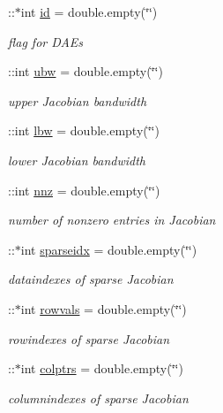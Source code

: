 \begin{DoxyCompactItemize}
\+::$\ast$int \mbox{\hyperlink{classamimodel_acf2488b95c97e0378c9bf49de3b50f28}{id}} = double.\+empty(\char`\"{}\char`\"{})
\begin{DoxyCompactList}\small\item\em flag for D\+A\+Es \end{DoxyCompactList}\item 
\+::int \mbox{\hyperlink{classamimodel_a955c9d10635afed4ebc04c60010e5d40}{ubw}} = double.\+empty(\char`\"{}\char`\"{})
\begin{DoxyCompactList}\small\item\em upper Jacobian bandwidth \end{DoxyCompactList}\item 
\+::int \mbox{\hyperlink{classamimodel_a784f5fb2b8eda576179be087c2a09a39}{lbw}} = double.\+empty(\char`\"{}\char`\"{})
\begin{DoxyCompactList}\small\item\em lower Jacobian bandwidth \end{DoxyCompactList}\item 
\+::int \mbox{\hyperlink{classamimodel_a825ec588729c090ff51ea3473dcbc6b9}{nnz}} = double.\+empty(\char`\"{}\char`\"{})
\begin{DoxyCompactList}\small\item\em number of nonzero entries in Jacobian \end{DoxyCompactList}\item 
\+::$\ast$int \mbox{\hyperlink{classamimodel_a6ffb112eda9ff756e17104210981b30b}{sparseidx}} = double.\+empty(\char`\"{}\char`\"{})
\begin{DoxyCompactList}\small\item\em dataindexes of sparse Jacobian \end{DoxyCompactList}\item 
\+::$\ast$int \mbox{\hyperlink{classamimodel_aa0abea3560da3f409a28567f42d52872}{rowvals}} = double.\+empty(\char`\"{}\char`\"{})
\begin{DoxyCompactList}\small\item\em rowindexes of sparse Jacobian \end{DoxyCompactList}\item 
\+::$\ast$int \mbox{\hyperlink{classamimodel_a887e8a11654afa197d040d8bb10cbb38}{colptrs}} = double.\+empty(\char`\"{}\char`\"{})
\begin{DoxyCompactList}\small\item\em columnindexes of sparse Jacobian \end{DoxyCompactList}\item 

\end{DoxyCompactItemize}

